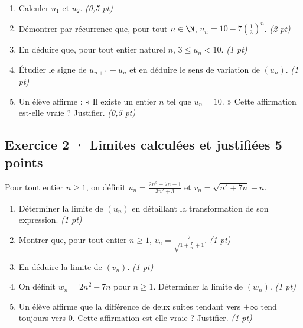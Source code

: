 \begin{enumerate}

\item Calculer $u_1$ et $u_2$. \hfill\textit{(0,5 pt)}

\item Démontrer par récurrence que, pour tout $n\in\N$, $u_n=10-7\left(\frac{1}{3}\right)^n$. \hfill\textit{(2 pt)}

\item En déduire que, pour tout entier naturel $n$, $3\le u_n<10$. \hfill\textit{(1 pt)}

\item Étudier le signe de $u_{n+1}-u_n$ et en déduire le sens de variation de $(u_n)$. \hfill\textit{(1 pt)}

\item Un élève affirme : « Il existe un entier $n$ tel que $u_n=10$. » Cette affirmation est-elle vraie ? Justifier. \hfill\textit{(0,5 pt)}

\end{enumerate}

\subsection*{Exercice 2 · Limites calculées et justifiées \hfill 5 points}Pour tout entier $n\ge1$, on définit $u_n=\frac{2n^2+7n-1}{3n^2+3}$ et $v_n=\sqrt{n^2+7n}-n$.

\begin{enumerate}

\item Déterminer la limite de $(u_n)$ en détaillant la transformation de son expression. \hfill\textit{(1 pt)}

\item Montrer que, pour tout entier $n\ge1$, $v_n=\frac{7}{\sqrt{1+\frac{7}n}+1}$. \hfill\textit{(1 pt)}

\item En déduire la limite de $(v_n)$. \hfill\textit{(1 pt)}

\item On définit $w_n=2n^2-7n$ pour $n\ge1$. Déterminer la limite de $(w_n)$. \hfill\textit{(1 pt)}

\item Un élève affirme que la différence de deux suites tendant vers $+\infty$ tend toujours vers $0$. Cette affirmation est-elle vraie ? Justifier. \hfill\textit{(1 pt)}

\end{enumerate}

